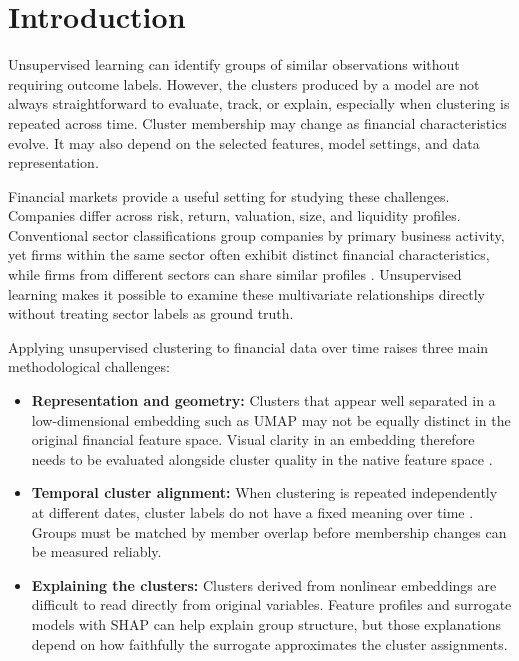 \section{Introduction}

Unsupervised learning can identify groups of similar observations without requiring outcome labels. However, the clusters produced by a model are not always straightforward to evaluate, track, or explain, especially when clustering is repeated across time. Cluster membership may change as financial characteristics evolve. It may also depend on the selected features, model settings, and data representation.

Financial markets provide a useful setting for studying these challenges. Companies differ across risk, return, valuation, size, and liquidity profiles. Conventional sector classifications group companies by primary business activity, yet firms within the same sector often exhibit distinct financial characteristics, while firms from different sectors can share similar profiles \citep{bhojraj2003,lee2015}. Unsupervised learning makes it possible to examine these multivariate relationships directly without treating sector labels as ground truth.

Applying unsupervised clustering to financial data over time raises three main methodological challenges:

\begin{itemize}
    \item \textbf{Representation and geometry:} Clusters that appear well separated in a low-dimensional embedding such as UMAP \citep{mcinnes2018} may not be equally distinct in the original financial feature space. Visual clarity in an embedding therefore needs to be evaluated alongside cluster quality in the native feature space \citep{rousseeuw1987,arbelaitz2013}.
    \item \textbf{Temporal cluster alignment:} When clustering is repeated independently at different dates, cluster labels do not have a fixed meaning over time \citep{spiliopoulou2006,greene2010}. Groups must be matched by member overlap before membership changes can be measured reliably.
    \item \textbf{Explaining the clusters:} Clusters derived from nonlinear embeddings are difficult to read directly from original variables. Feature profiles and surrogate models with SHAP \citep{merrick2020,rozemberczki2022} can help explain group structure, but those explanations depend on how faithfully the surrogate approximates the cluster assignments.
\end{itemize}

